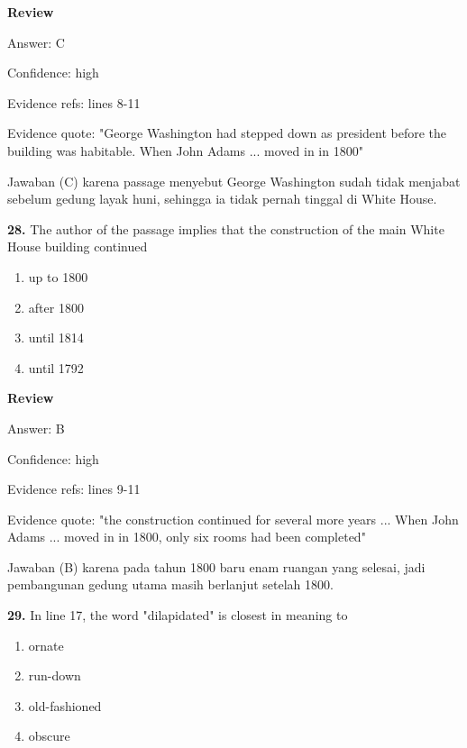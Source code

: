 \documentclass[12pt]{article}
\begin{document}
\par
\begingroup
\setlength{\parskip}{0pt}
\setlength{\parindent}{0pt}
\textbf{Review}\par
Answer: C\par
Confidence: high\par
Evidence refs: lines 8-11\par
Evidence quote: "George Washington had stepped down as president before the building was habitable. When John Adams ... moved in in 1800"\par
Jawaban (C) karena passage menyebut George Washington sudah tidak menjabat sebelum gedung layak huni, sehingga ia tidak pernah tinggal di White House.\par
\endgroup
\par
\vspace{0.25\baselineskip}
\noindent\textbf{28.} The author of the passage implies that the construction of the main White House building continued
\begin{enumerate}[label=(\Alph*),leftmargin=*,itemsep=0.2em]
\item up to 1800
\item after 1800
\item until 1814
\item until 1792
\end{enumerate}
\par
\begingroup
\setlength{\parskip}{0pt}
\setlength{\parindent}{0pt}
\textbf{Review}\par
Answer: B\par
Confidence: high\par
Evidence refs: lines 9-11\par
Evidence quote: "the construction continued for several more years ... When John Adams ... moved in in 1800, only six rooms had been completed"\par
Jawaban (B) karena pada tahun 1800 baru enam ruangan yang selesai, jadi pembangunan gedung utama masih berlanjut setelah 1800.\par
\endgroup
\par
\vspace{0.25\baselineskip}
\noindent\textbf{29.} In line 17, the word "dilapidated" is closest in meaning to
\begin{enumerate}[label=(\Alph*),leftmargin=*,itemsep=0.2em]
\item ornate
\item run-down
\item old-fashioned
\item obscure
\end{enumerate}
\end{document}

